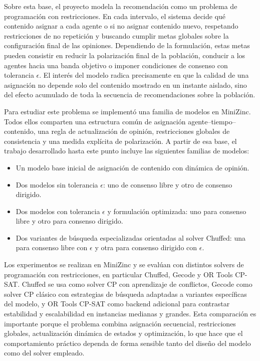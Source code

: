 \documentclass[10pt,letterpaper]{article}
\begin{document}
Sobre esta base, el proyecto modela la recomendaci\'on como un problema de programaci\'on con restricciones. En cada intervalo, el sistema decide qu\'e contenido asignar a cada agente o si no asignar contenido nuevo, respetando restricciones de no repetici\'on y buscando cumplir metas globales sobre la configuraci\'on final de las opiniones. Dependiendo de la formulaci\'on, estas metas pueden consistir en reducir la polarizaci\'on final de la poblaci\'on, conducir a los agentes hacia una banda objetivo o imponer condiciones de consenso con tolerancia \(\epsilon\). El inter\'es del modelo radica precisamente en que la calidad de una asignaci\'on no depende solo del contenido mostrado en un instante aislado, sino del efecto acumulado de toda la secuencia de recomendaciones sobre la poblaci\'on.

Para estudiar este problema se implement\'o una familia de modelos en MiniZinc. Todos ellos comparten una estructura com\'un de asignaci\'on agente--tiempo--contenido, una regla de actualizaci\'on de opini\'on, restricciones globales de consistencia y una medida expl\'icita de polarizaci\'on. A partir de esa base, el trabajo desarrollado hasta este punto incluye las siguientes familias de modelos:

\begin{itemize}
    \item Un modelo base inicial de asignaci\'on de contenido con din\'amica de opini\'on.
    \item Dos modelos sin tolerancia \(\epsilon\): uno de consenso libre y otro de consenso dirigido.
    \item Dos modelos con tolerancia \(\epsilon\) y formulaci\'on optimizada: uno para consenso libre y otro para consenso dirigido.
    \item Dos variantes de b\'usqueda especializadas orientadas al solver Chuffed: una para consenso libre con \(\epsilon\) y otra para consenso dirigido con \(\epsilon\).
\end{itemize}

Los experimentos se realizan en MiniZinc y se eval\'uan con distintos solvers de programaci\'on con restricciones, en particular Chuffed, Gecode y OR Tools CP-SAT. Chuffed se usa como solver CP con aprendizaje de conflictos, Gecode como solver CP cl\'asico con estrategias de b\'usqueda adaptadas a variantes espec\'ificas del modelo, y OR Tools CP-SAT como backend adicional para contrastar estabilidad y escalabilidad en instancias medianas y grandes. Esta comparaci\'on es importante porque el problema combina asignaci\'on secuencial, restricciones globales, actualizaci\'on din\'amica de estados y optimizaci\'on, lo que hace que el comportamiento pr\'actico dependa de forma sensible tanto del dise\~no del modelo como del solver empleado.
\end{document}
